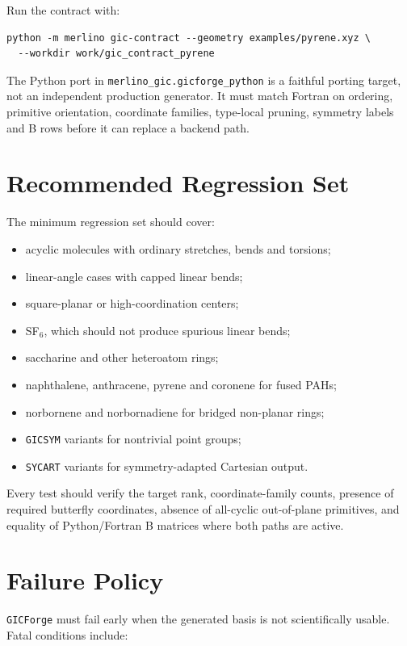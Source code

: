 \documentclass[11pt]{article}
\newcommand{\program}{\texttt{GICForge}}
\begin{document}
\noindent
Run the contract with:

\begin{lstlisting}[style=merlino]
python -m merlino gic-contract --geometry examples/pyrene.xyz \
  --workdir work/gic_contract_pyrene
\end{lstlisting}

\noindent
The Python port in \texttt{merlino\_gic.gicforge\_python} is a faithful porting
target, not an independent production generator.  It must match Fortran on
ordering, primitive orientation, coordinate families, type-local pruning,
symmetry labels and B rows before it can replace a backend path.

\section{Recommended Regression Set}

The minimum regression set should cover:

\begin{itemize}
  \item acyclic molecules with ordinary stretches, bends and torsions;
  \item linear-angle cases with capped linear bends;
  \item square-planar or high-coordination centers;
  \item SF\(_6\), which should not produce spurious linear bends;
  \item saccharine and other heteroatom rings;
  \item naphthalene, anthracene, pyrene and coronene for fused PAHs;
  \item norbornene and norbornadiene for bridged non-planar rings;
  \item \texttt{GICSYM} variants for nontrivial point groups;
  \item \texttt{SYCART} variants for symmetry-adapted Cartesian output.
\end{itemize}

\noindent
Every test should verify the target rank, coordinate-family counts, presence of
required butterfly coordinates, absence of all-cyclic out-of-plane primitives,
and equality of Python/Fortran B matrices where both paths are active.

\section{Failure Policy}

\program{} must fail early when the generated basis is not scientifically
usable.  Fatal conditions include:
\end{document}
